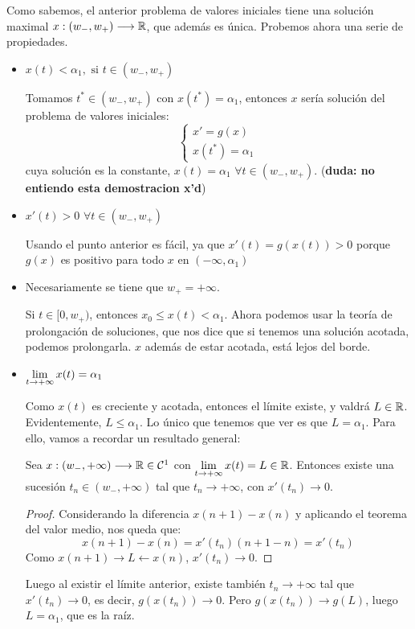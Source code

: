 Como sabemos, el anterior problema de valores iniciales tiene una solución maximal $x : (w_-,w_+) \longrightarrow \mathbb{R}$, que además es única. Probemos ahora una serie de propiedades.
\begin{itemize}
\item $x(t)<\alpha_1, \text{ si } t\in(w_-,w_+)$

Tomamos $t^*\in(w_-,w_+)$ con $x(t^*)=\alpha_1$, entonces $x$ sería solución del problema de valores iniciales:
\[
\left\{
\begin{array}{l}
x'=g(x) \\
x(t^*)=\alpha_1
\end{array}
\right.
\]
cuya solución es la constante, $x(t)=\alpha_1$ $\forall t\in(w_-,w_+)$. (\textbf{duda: no entiendo esta demostracion x'd})

\item $x'(t)>0$ $\forall t\in(w_-,w_+)$

Usando el punto anterior es fácil, ya que $x'(t)=g(x(t))>0$ porque $g(x)$ es positivo para todo $x$ en $(-\infty, \alpha_1)$

\item Necesariamente se tiene que $w_+=+\infty$.

Si $t\in[0,w_+)$, entonces $x_0\leq x(t) < \alpha_1$. Ahora podemos usar la teoría de prolongación de soluciones, que nos dice que si tenemos una solución acotada, podemos prolongarla. $x$ además de estar acotada, está lejos del borde. 

\item $\displaystyle\lim_{  t  \to +\infty }  x(t) =\alpha_1$

Como $x(t)$ es creciente y acotada, entonces el límite existe, y valdrá $L\in\mathbb{R}$. Evidentemente, $L\leq \alpha_1$. Lo único que tenemos que ver es que $L=\alpha_1$. Para ello, vamos a recordar un resultado general:
\begin{lemma}
Sea $x : (w_-,+\infty) \longrightarrow \mathbb{R}\in\mathcal{C}^1$ con $\displaystyle\lim_{  t  \to +\infty }  x(t) =L\in\mathbb{R}$. Entonces existe una sucesión $t_n\in(w_-,+\infty)$ tal que $t_n\longrightarrow +\infty$, con $x'(t_n)\longrightarrow 0$.
\end{lemma}
\begin{proof}
Considerando la diferencia $x(n+1)-x(n)$ y aplicando el teorema del valor medio, nos queda que:
\[
x(n+1)-x(n)=x'(t_n)(n+1-n)=x'(t_n)
\]
Como $x(n+1)\longrightarrow L \leftarrow x(n)$, $x'(t_n)\longrightarrow 0$.
\end{proof}
Luego al existir el límite anterior, existe también $t_n\longrightarrow +\infty$ tal que $x'(t_n)\longrightarrow 0$, es decir, $g(x(t_n))\longrightarrow 0$.  Pero $g(x(t_n))\longrightarrow g(L)$, luego $L=\alpha_1$, que es la raíz.
\end{itemize}

